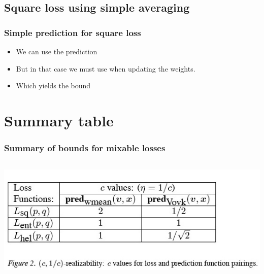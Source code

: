 \documentclass[handout]{beamer}
\begin{document}
\subsection{Square loss using simple averaging}

\begin{frame}
\frametitle{Simple prediction for square loss}
\begin{itemize}
\item We can use the prediction
\R{\[
\gamma = \frac{\sum_i \weight{i}{} \gamma_i}{\sum_i \weight{i}{}}
\]}
\item But in that case we must use  when updating the weights.
\item Which yields the bound
\end{itemize}
\end{frame}

\section{Summary table}

\begin{frame}
\frametitle{Summary of bounds for mixable losses}
\includegraphics[height=6cm]{figures/summarytable.jpg}
\end{frame}

%
\end{document}
